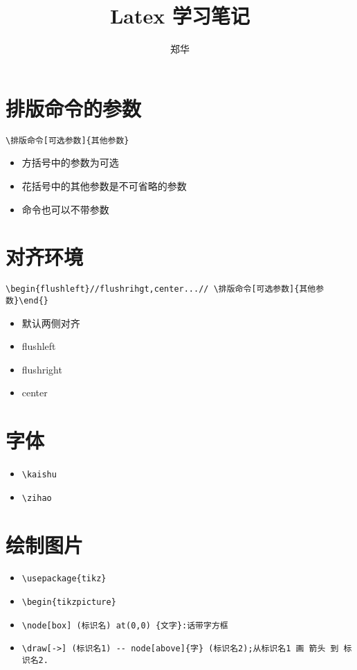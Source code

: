 \documentclass[UTF8,a4paper,8pt]{ctexart}
\author{郑华}
\title{Latex 学习笔记}
\begin{document}
 	\maketitle
 
\section{排版命令的参数}
	\verb|\排版命令[可选参数]{其他参数}|
  
	  \begin{itemize}
	  	\item 方括号中的参数为可选
	  	\item 花括号中的其他参数是不可省略的参数
	  	\item 命令也可以不带参数
	  \end{itemize}
\section{对齐环境}
	 \verb|\begin{flushleft}//flushrihgt,center...// \排版命令[可选参数]{其他参数}\end{}|
	    \begin{itemize}
	    	\item 默认两侧对齐
	    	\item flushleft
	    	\item flushright
	    	\item center
	    \end{itemize}

\section{字体}
		\begin{itemize}
			\item \kaishu \verb|\kaishu|
			\item {} \verb|\zihao|
		\end{itemize}
		
\section{绘制图片}
	    \begin{itemize}
	    	\item \verb|\usepackage{tikz}|
	    	\item \verb|\begin{tikzpicture}|
	    	\item \verb|\node[box] (标识名) at(0,0) {文字}:话带字方框|
	    	\item \verb|\draw[->] (标识名1) -- node[above]{字} (标识名2);从标识名1 画 箭头 到 标识名2.|
	    \end{itemize}
	    
\end{document}

